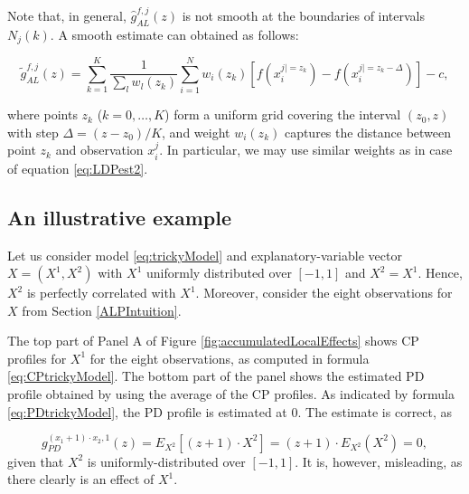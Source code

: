 \documentclass[]{krantz}
\begin{document}
Note that, in general, \(\widehat{g}_{AL}^{f,j}(z)\) is not smooth at the boundaries of intervals \(N_j(k)\). A smooth estimate can obtained as follows:

\begin{equation}
\widetilde{g}_{AL}^{f,j}(z) = \sum_{k=1}^K \frac{1}{\sum_{l} w_l(z_k)} \sum_{i=1}^N w_{i}(z_k) \left[f(x_i^{j| = z_k}) - f(x_i^{j| = z_k - \Delta})\right] - c,
\label{eq:ALPest2}
\end{equation}

where points \(z_k\) (\(k=0, \ldots, K\)) form a uniform grid covering the interval \((z_0,z)\) with step \(\Delta = (z-z_0)/K\), and weight \(w_i(z_k)\) captures the distance between point \(z_k\) and observation \(x_i^j\). In particular, we may use similar weights as in case of equation \eqref{eq:LDPest2}.

\hypertarget{summaryFeatureEffects}{%
\subsection{An illustrative example}\label{summaryFeatureEffects}}

Let us consider model \eqref{eq:trickyModel} and explanatory-variable vector \(X=(X^1,X^2)\) with \(X^1\) uniformly distributed over \([-1,1]\) and \(X^2=X^1\). Hence, \(X^2\) is perfectly correlated with \(X^1\). Moreover, consider the eight observations for \(X\) from Section \ref{ALPIntuition}.

The top part of Panel A of Figure \ref{fig:accumulatedLocalEffects} shows CP profiles for \(X^1\) for the eight observations, as computed in formula \eqref{eq:CPtrickyModel}. The bottom part of the panel shows the estimated PD profile obtained by using the average of the CP profiles. As indicated by formula \eqref{eq:PDtrickyModel}, the PD profile is estimated at 0. The estimate is correct, as

\[
g_{PD}^{(x_1+1)\cdot x_2,1}(z) = E_{X^2}[(z+ 1)\cdot X^2] = (z+1)\cdot E_{X^2}(X^2) = 0,
\]
given that \(X^2\) is uniformly-distributed over \([-1,1]\). It is, however, misleading, as there clearly is an effect of \(X^1\).
\end{document}
